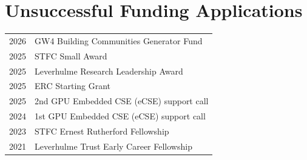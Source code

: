 \documentclass[a4paper, 11pt]{article}
\begin{document}
\section{Unsuccessful Funding Applications}
\begin{tabularx}{\linewidth}{@{}lX@{}}
2026 & GW4 Building Communities Generator Fund \\
2025 & STFC Small Award \\
2025 & Leverhulme Research Leadership Award \\
2025 & ERC Starting Grant \\
2025 & 2nd GPU Embedded CSE (eCSE) support call \\
2024 & 1st GPU Embedded CSE (eCSE) support call \\
2023 & STFC Ernest Rutherford Fellowship \\
2021 & Leverhulme Trust Early Career Fellowship \\
\end{tabularx}
\end{document}
